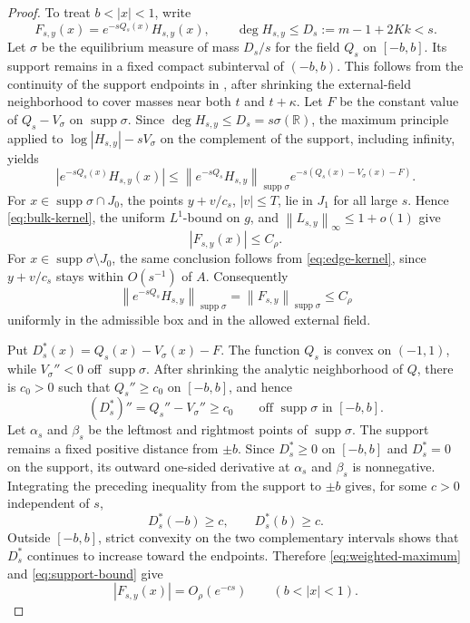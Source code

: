 \documentclass[11pt]{article}
\theoremstyle{definition}
\numberwithin{equation}{section}
\DeclareMathOperator{\supp}{supp}
\newcommand{\R}{\mathbb R}
\newcommand{\norm}[1]{\left\lVert #1\right\rVert}
\begin{document}
\begin{proof}
To treat \(b<|x|<1\), write
\[
 F_{s,y}(x)=e^{-sQ_s(x)}H_{s,y}(x),
 \qquad
 \deg H_{s,y}\le D_s:=m-1+2Kk<s.
\]
Let \(\sigma\) be the equilibrium measure of mass \(D_s/s\)
for the field \(Q_s\) on \([-b,b]\).
Its support remains in a fixed compact subinterval of \((-b,b)\).
This follows from the continuity of the support endpoints in
\cite[Lemma 2.4]{KSSV}, after shrinking the external-field
neighborhood to cover masses near both \(t\) and \(t+\kappa\).
Let \(F\) be the constant value of \(Q_s-V_\sigma\) on
\(\supp\sigma\). Since \(\deg H_{s,y}\le D_s=s\sigma(\R)\), the
maximum principle applied to \(\log|H_{s,y}|-sV_\sigma\) on the
complement of the support, including infinity, yields
\begin{equation}\label{eq:weighted-maximum}
 |e^{-sQ_s(x)}H_{s,y}(x)|
 \le \norm{e^{-sQ_s}H_{s,y}}_{\supp\sigma}
 e^{-s(Q_s(x)-V_\sigma(x)-F)}.
\end{equation}
For \(x\in\supp\sigma\cap J_0\), the points
\(y+v/c_s\), \(|v|\le T\), lie in \(J_1\) for all large \(s\).
Hence \eqref{eq:bulk-kernel}, the uniform \(L^1\)-bound on \(g\),
and \(\norm{L_{s,y}}_\infty\le1+o(1)\) give
\[
 |F_{s,y}(x)|\le C_\rho.
\]
For \(x\in\supp\sigma\setminus J_0\), the same conclusion follows
from \eqref{eq:edge-kernel}, since \(y+v/c_s\) stays within
\(O(s^{-1})\) of \(A\). Consequently
\begin{equation}\label{eq:support-bound}
 \norm{e^{-sQ_s}H_{s,y}}_{\supp\sigma}
 =\norm{F_{s,y}}_{\supp\sigma}\le C_\rho
\end{equation}
uniformly in the admissible box and in the allowed external field.

Put \(D_s^*(x)=Q_s(x)-V_\sigma(x)-F\). The function \(Q_s\) is
convex on \((-1,1)\), while \(V_\sigma''<0\) off \(\supp\sigma\).
After shrinking the analytic neighborhood of \(Q\), there is
\(c_0>0\) such that \(Q_s''\ge c_0\) on \([-b,b]\), and hence
\[
 (D_s^*)''=Q_s''-V_\sigma''\ge c_0
 \qquad\text{off }\supp\sigma\text{ in }[-b,b].
\]
Let \(\alpha_s\) and \(\beta_s\) be the leftmost and rightmost points
of \(\supp\sigma\). The support remains a fixed positive distance
from \(\pm b\). Since \(D_s^*\ge0\) on \([-b,b]\) and \(D_s^*=0\) on the support,
its outward one-sided derivative at \(\alpha_s\) and \(\beta_s\) is
nonnegative. Integrating the preceding inequality from the support
to \(\pm b\) gives, for some \(c>0\) independent of \(s\),
\[
 D_s^*(-b)\ge c,\qquad D_s^*(b)\ge c.
\]
Outside \([-b,b]\), strict convexity on the two complementary
intervals shows that \(D_s^*\) continues to increase toward the
endpoints. Therefore \eqref{eq:weighted-maximum} and
\eqref{eq:support-bound} give
\begin{equation}\label{eq:weighted-exterior}
 |F_{s,y}(x)|=O_\rho(e^{-cs})
 \qquad(b<|x|<1).
\end{equation}


\end{proof}
\end{document}
